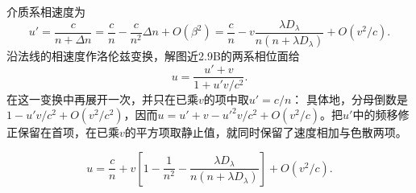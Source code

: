 \documentclass[UTF8,fontset=fandol,a4paper,11pt]{ctexart}
\begin{document}
介质系相速度为
\[
u'=\frac{c}{n+\Delta n}
=\frac cn-\frac{c}{n^2}\Delta n+O(\beta^2)
=\frac cn-
v\frac{\lambda D_\lambda}{n(n+\lambda D_\lambda)}
+O(v^2/c).
\]
沿法线的相速度作洛伦兹变换，解图近2.9B的两系相位面给
\[
u=\frac{u'+v}{1+u'v/c^2}.
\]
在这一变换中再展开一次，并只在已乘$v$的项中取$u'=c/n$：
具体地，分母倒数是$1-u'v/c^2+O(v^2/c^2)$，因而$u=u'+v-u'^2v/c^2+O(v^2/c)$。把$u'$中的频移修正保留在首项，在已乘$v$的平方项取静止值，就同时保留了速度相加与色散两项。

\[
\boxed{u=\frac cn+v\left[
1-\frac1{n^2}
-\frac{\lambda D_\lambda}{n(n+\lambda D_\lambda)}
\right]+O(v^2/c)}.
\]
\begin{center}\begin{minipage}{.98\linewidth}\centering
{}
\end{minipage}
\end{center}
\end{document}
